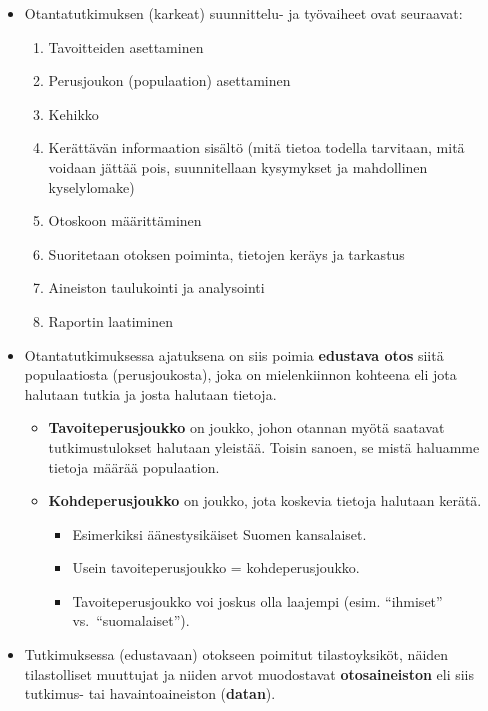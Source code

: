 \documentclass[
]{book}
\providecommand{\tightlist}{%
  \setlength{\itemsep}{0pt}\setlength{\parskip}{0pt}}
\begin{document}
\begin{itemize}
\tightlist
\item
  Otantatutkimuksen (karkeat) suunnittelu- ja työvaiheet ovat seuraavat:

  \begin{enumerate}
  \def\labelenumi{\arabic{enumi}.}
  \tightlist
  \item
    Tavoitteiden asettaminen
  \item
    Perusjoukon (populaation) asettaminen
  \item
    Kehikko
  \item
    Kerättävän informaation sisältö (mitä tietoa todella tarvitaan, mitä voidaan jättää pois, suunnitellaan kysymykset ja mahdollinen kyselylomake)
  \item
    Otoskoon määrittäminen
  \item
    Suoritetaan otoksen poiminta, tietojen keräys ja tarkastus
  \item
    Aineiston taulukointi ja analysointi
  \item
    Raportin laatiminen
  \end{enumerate}
\item
  Otantatutkimuksessa ajatuksena on siis poimia \textbf{edustava otos} siitä populaatiosta (perusjoukosta), joka on mielenkiinnon kohteena eli jota halutaan tutkia ja josta halutaan tietoja.

  \begin{itemize}
  \tightlist
  \item
    \textbf{Tavoiteperusjoukko} on joukko, johon otannan myötä saatavat tutkimustulokset halutaan yleistää. Toisin sanoen, se mistä haluamme tietoja määrää populaation.
  \item
    \textbf{Kohdeperusjoukko} on joukko, jota koskevia tietoja halutaan kerätä.

    \begin{itemize}
    \tightlist
    \item
      Esimerkiksi äänestysikäiset Suomen kansalaiset.
    \item
      Usein tavoiteperusjoukko = kohdeperusjoukko.
    \item
      Tavoiteperusjoukko voi joskus olla laajempi (esim. ``ihmiset'' vs.~``suomalaiset'').
    \end{itemize}
  \end{itemize}
\item
  Tutkimuksessa (edustavaan) otokseen poimitut tilastoyksiköt, näiden tilastolliset muuttujat ja niiden arvot muodostavat \textbf{otosaineiston} eli siis tutkimus- tai havaintoaineiston (\textbf{datan}).


\end{itemize}
\end{document}
